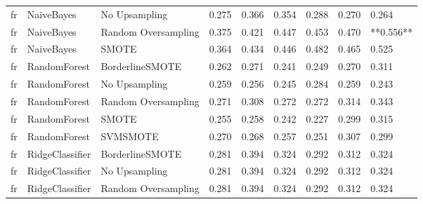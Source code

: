 \begin{tabular}{lllllllll}
      fr &                      NaiveBayes &                 No Upsampling & 0.275 &                     0.366 &                 0.354 &                  0.288 &                                   0.270 &     0.264 \\
      fr &                      NaiveBayes &           Random Oversampling & 0.375 &                     0.421 &                 0.447 &                  0.453 &                                   0.470 & **0.556** \\
      fr &                      NaiveBayes &                         SMOTE & 0.364 &                     0.434 &                 0.446 &                  0.482 &                                   0.465 &     0.525 \\
      fr &                    RandomForest &               BorderlineSMOTE & 0.262 &                     0.271 &                 0.241 &                  0.249 &                                   0.270 &     0.311 \\
      fr &                    RandomForest &                 No Upsampling & 0.259 &                     0.256 &                 0.245 &                  0.284 &                                   0.259 &     0.243 \\
      fr &                    RandomForest &           Random Oversampling & 0.271 &                     0.308 &                 0.272 &                  0.272 &                                   0.314 &     0.343 \\
      fr &                    RandomForest &                         SMOTE & 0.255 &                     0.258 &                 0.242 &                  0.227 &                                   0.299 &     0.315 \\
      fr &                    RandomForest &                      SVMSMOTE & 0.270 &                     0.268 &                 0.257 &                  0.251 &                                   0.307 &     0.299 \\
      fr &                 RidgeClassifier &               BorderlineSMOTE & 0.281 &                     0.394 &                 0.324 &                  0.292 &                                   0.312 &     0.324 \\
      fr &                 RidgeClassifier &                 No Upsampling & 0.281 &                     0.394 &                 0.324 &                  0.292 &                                   0.312 &     0.324 \\
      fr &                 RidgeClassifier &           Random Oversampling & 0.281 &                     0.394 &                 0.324 &                  0.292 &                                   0.312 &     0.324 \\

\end{tabular}
